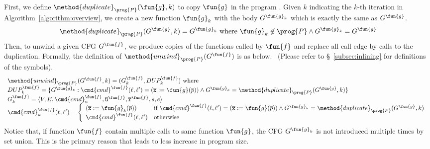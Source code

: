 
First, we define $\method{duplicate}_\prog{P}(\fun{g}, k)$ to copy $\fun{g}$ in
the program .
Given $k$ indicating the $k$-th iteration in Algorithm~\ref{algorithm:overview},
we create a new function $\fun{g}_k$ with the body $G^{\fun{g}_k}$ which is
exactly the same as $G^\fun{g}$.
\[
  \method{duplicate}_\prog{P}(G^\fun{g}, k)
    = G^{\fun{g}_k} \text{ where } \fun{g}_k \not\in \prog{P} \land G^{\fun{g}_k}=G^\fun{g}
\]
Then, to unwind a given CFG $G^\fun{f}$, we produce copies of the functions
called by $\fun{f}$ and replace all call edge by calls to the duplication.
Formally, the definition of $\method{unwind}_\prog{P}(G^\fun{f})$ is as below.
~(Please refer to \S~\ref{subsec:inlining} for definitions of the symbols).
\[
\begin{array}{l}
\method{unwind}_\prog{P}(G^\fun{f}, k)
  = (G^\fun{f}_k, DUP^\fun{f}_k) \text{ where} \\
DUP^\fun{f}_k = \{G^{\fun{g}_k} :
    \cmd{cmd}^\fun{f}(\ell,\ell')=(\overline{\texttt{x}}:=\fun{g}(\overline{p}))
    \land G^{\fun{g}_k} = \method{duplicate}_\prog{P}(G^\fun{g}, k)
  \}\\
G^\fun{f}_k = \langle V, E,\cmd{cmd}_u^\fun{f}, \overline{\texttt{u}}^\fun{f},
      \overline{\texttt{r}}^\fun{f},s,e \rangle \\
{%
\cmd{cmd}_u^\fun{f} (\ell, \ell') =
\left\{
  \begin{array}{ll}
  (\overline{\texttt{x}}:=\fun{g}_k(\overline{p})) &\text{if } 
    \cmd{cmd}^\fun{f}(\ell,\ell')=(\overline{\texttt{x}}:=\fun{g}(\overline{p}))
    \land G^{\fun{g}_k} = \method{duplicate}_\prog{P}(G^\fun{g}, k)\\
  \cmd{cmd}^\fun{f}(\ell,\ell') &\text{otherwise}
  \end{array}
\right.
}
\end{array}
\]
Notice that, if function $\fun{f}$ contain multiple calls to same function
$\fun{g}$,
the CFG $G^{\fun{g}_k}$ is not introduced multiple times by set union.
This is the primary reason that leads to less increase in program size.

